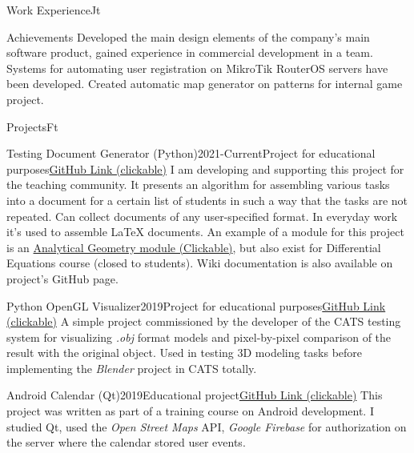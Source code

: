 \documentclass[10pt]{extarticle}
\begin{document}
\begin{centralpart}{Work Experience}{J}{t}
		\begin{additionalblock}{Achievements}
			Developed the main design elements of the company's main software product, gained experience in commercial development in a team. Systems for automating user registration on MikroTik RouterOS servers have been developed. Created automatic map generator on patterns for internal game project.
		\end{additionalblock}

	\end{centralpart}

	\BottomSignature

	\NewPage
	\ApplyNoSideBar
	\DrawSimpleSideBar

	\begin{centralpart}{Projects}{F}{t}

		\begin{titleblock}{Testing Document Generator (Python)}{2021-Current}{Project for educational purposes}{\href{https://github.com/AriosJentu/TestingDocumentGenerator}{GitHub Link (clickable)}}
			\hspace{15pt} I am developing and supporting this project for the teaching community. It presents an algorithm for assembling various tasks into a document for a certain list of students in such a way that the tasks are not repeated. Can collect documents of any user-specified format. In everyday work it's used to assemble LaTeX documents. An example of a module for this project is an {\color{sidetopsep}\href{https://github.com/AriosJentu/AnalyticGeometryTasks}{Analytical Geometry module (Clickable)}}, but also exist for Differential Equations course (closed to students). Wiki documentation is also available on project's GitHub page.
		\end{titleblock}

		\begin{titleblock}{Python OpenGL Visualizer}{2019}{Project for educational purposes}{\href{https://github.com/AriosJentu/PyOpenGLVisualizer}{GitHub Link (clickable)}}
			\hspace{15pt} A simple project commissioned by the developer of the CATS testing system for visualizing \textit{\color{sidetopsep}.obj} format models and pixel-by-pixel comparison of the result with the original object. Used in testing 3D modeling tasks before implementing the \textit{Blender} project in CATS totally.
		\end{titleblock}

		\begin{titleblock}{Android Calendar (Qt)}{2019}{Educational project}{\href{https://github.com/AriosJentu/QTCalendar}{GitHub Link (clickable)}}
			\hspace{15pt} This project was written as part of a training course on Android development. I studied Qt, used the \textit{Open Street Maps} API, \textit{Google Firebase} for authorization on the server where the calendar stored user events. 
		\end{titleblock}


\end{centralpart}
\end{document}
